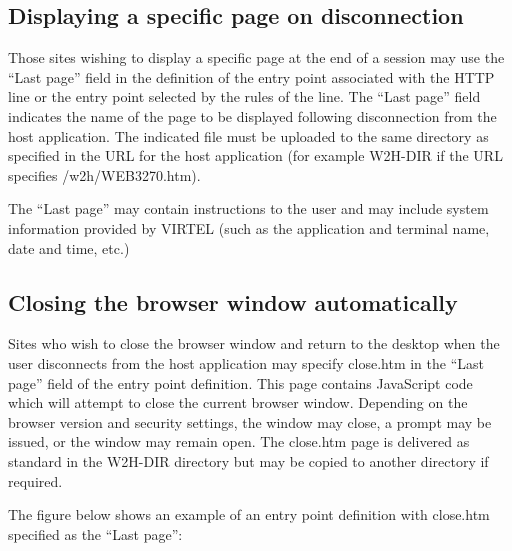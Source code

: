 \documentclass[letterpaper,10pt,english]{sphinxmanual}
\begin{document}
\subsection{Displaying a specific page on disconnection}
\label{\detokenize{User_Guide:displaying-a-specific-page-on-disconnection}}
Those sites wishing to display a specific page at the end of a session may use the “Last page” field in the definition of
the entry point associated with the HTTP line or the entry point selected by the rules of the line. The “Last page” field
indicates the name of the page to be displayed following disconnection from the host application. The indicated file
must be uploaded to the same directory as specified in the URL for the host application (for example W2H-DIR if the
URL specifies /w2h/WEB3270.htm).

The “Last page” may contain instructions to the user and may include system information provided by VIRTEL (such as
the application and terminal name, date and time, etc.)


\subsection{Closing the browser window automatically}
\label{\detokenize{User_Guide:closing-the-browser-window-automatically}}
Sites who wish to close the browser window and return to the desktop when the user disconnects from the host
application may specify close.htm in the “Last page” field of the entry point definition. This page contains JavaScript
code which will attempt to close the current browser window. Depending on the browser version and security settings,
the window may close, a prompt may be issued, or the window may remain open. The close.htm page is delivered as
standard in the W2H-DIR directory but may be copied to another directory if required.

The figure below shows an example of an entry point definition with close.htm specified as the “Last page”:
\end{document}
